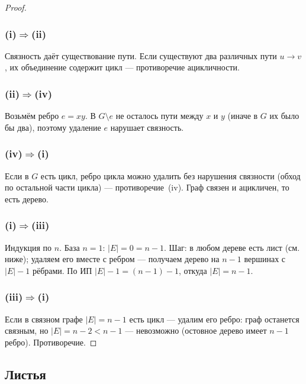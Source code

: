 \begin{proof}

  \subsubsection*{(i)$\Rightarrow$(ii)}

  Связность даёт существование пути.
  Если существуют два различных пути $u\to v$, их объединение содержит цикл
  — противоречие ацикличности.

  \subsubsection*{(ii)$\Rightarrow$(iv)}

  Возьмём ребро $e=xy$. В $G\setminus e$ не осталось пути между $x$ и $y$
  (иначе в $G$ их было бы два), поэтому удаление $e$ нарушает связность.

  \subsubsection*{(iv)$\Rightarrow$(i)}

  Если в $G$ есть цикл, ребро цикла можно удалить без нарушения связности
  (обход по остальной части цикла) — противоречие~(iv).
  Граф связен и ацикличен, то есть дерево.

  \subsubsection*{(i)$\Rightarrow$(iii)}

  Индукция по $n$. База $n=1$: $|E|=0=n-1$.
  Шаг: в любом дереве есть лист (см. ниже); удаляем его вместе с ребром —
  получаем дерево на $n-1$ вершинах с $|E|-1$ рёбрами.
  По ИП $|E|-1=(n-1)-1$, откуда $|E|=n-1$.

  \subsubsection*{(iii)$\Rightarrow$(i)}

  Если в связном графе $|E|=n-1$ есть цикл — удалим его ребро:
  граф останется связным, но $|E|=n-2 < n-1$ —
  невозможно (остовное дерево имеет $n-1$ ребро). Противоречие.
\end{proof}

\subsection{Листья}

